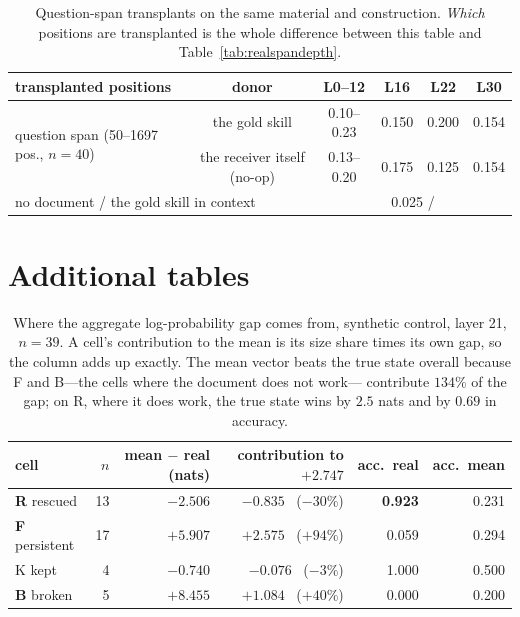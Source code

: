 \documentclass{article}
\begin{document}
\begin{table}[h]
\caption{Question-span transplants on the same material and construction.
\emph{Which} positions are transplanted is the whole difference between this
table and Table~\ref{tab:realspandepth}.}
\label{tab:realspan}
\centering
\small
\begin{tabular}{lccccc}
\toprule
transplanted positions & donor & L0--12 & L16 & L22 & L30 \\
\midrule
\multirow{2}{*}{question span (50--1697 pos., $n=40$)}
 & the gold skill   & 0.10--0.23 & 0.150 & 0.200 & 0.154 \\
 & the receiver itself (no-op) & 0.13--0.20 & 0.175 & 0.125 & 0.154 \\
\midrule
\multicolumn{2}{l}{no document / the gold skill in context}
 & \multicolumn{4}{c}{0.025 \quad / \quad 0.950} \\
\bottomrule
\end{tabular}
\end{table}

\clearpage

\section{Additional tables}

\begin{table}[h]
\caption{Where the aggregate log-probability gap comes from, synthetic control,
layer 21, $n=39$. A cell's contribution to the mean is its size share times its
own gap, so the column adds up exactly. The mean vector beats the true state
overall because F and B---the cells where the document does not work---%
contribute $134\%$ of the gap; on R, where it does work, the true state wins by
$2.5$ nats and by $0.69$ in accuracy.}
\label{tab:cells}
\centering
\small
\begin{tabular}{lrrrrr}
\toprule
cell & $n$ & mean $-$ real (nats) & contribution to $+2.747$ & acc.\ real & acc.\ mean \\
\midrule
\textbf{R} rescued    & 13 & $-2.506$ & $-0.835$ \ ($-30\%$) & \textbf{0.923} & 0.231 \\
\textbf{F} persistent & 17 & $+5.907$ & $+2.575$ \ ($+94\%$) & 0.059 & 0.294 \\
K kept                &  4 & $-0.740$ & $-0.076$ \ ($-3\%$)  & 1.000 & 0.500 \\
\textbf{B} broken     &  5 & $+8.455$ & $+1.084$ \ ($+40\%$) & 0.000 & 0.200 \\
\bottomrule
\end{tabular}
\end{table}
\end{document}

